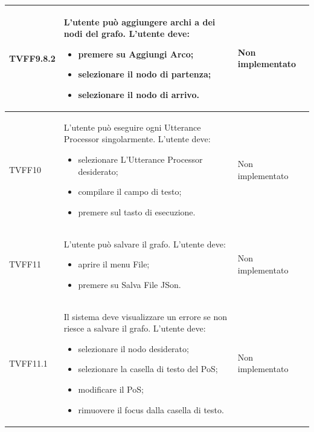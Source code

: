 \documentclass[openany,12pt,a4paper]{report}
\begin{document}
\begin{longtable}{| p{3cm} |p{8cm} | p{2.5cm} |}
	\newline TVFF9.8.2&
	\newline L'utente può aggiungere archi a dei nodi del grafo. L'utente deve:
	\begin{itemize}
		\item premere su Aggiungi Arco;
		\item selezionare il nodo di partenza;
		\item selezionare il nodo di arrivo.
	\end{itemize}&
	\newline Non implementato
	\\[1em]
	\hline
	
	\newline TVFF10&
	\newline L'utente può eseguire ogni Utterance Processor singolarmente. L'utente deve:
	\begin{itemize}
		\item selezionare L'Utterance Processor desiderato;
		\item compilare il campo di testo;
		\item premere sul tasto di esecuzione.
	\end{itemize}&
	\newline Non implementato
	\\[1em]
	\hline
	
	
	\newline TVFF11&
	\newline L'utente può salvare il grafo. L'utente deve:
	\begin{itemize}
		\item aprire il menu File;
		\item premere su Salva File JSon.
	\end{itemize}&
	\newline Non implementato
	\\[1em]
	\hline	
	
	\newline TVFF11.1&
	\newline Il sistema deve visualizzare un errore se non riesce a salvare il grafo. L'utente deve:
	\begin{itemize}
		\item selezionare il nodo desiderato;
		\item selezionare la casella di testo del PoS;
		\item modificare il PoS;
		\item rimuovere il focus dalla casella di testo.
	\end{itemize}&
	\newline Non implementato 
	\\[1em]
	\hline
	

\end{longtable}
\end{document}
